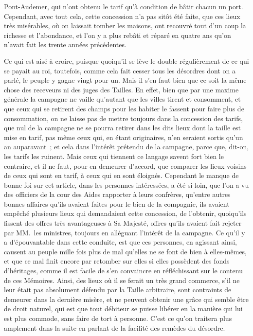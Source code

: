 \documentclass[french,twoside]{book} %
\begin{document}
Pont-Audemer, qui n’ont obtenu le tarif qu’à condition de bâtir chacun un port. Cependant, avec tout cela, cette concession n’a pas sitôt été faite, que ces lieux très misérables, où on laissait tomber les maisons, ont recouvré tout d’un coup la richesse et l’abondance, et l’on y a plus rebâti et réparé en quatre ans qu’on n’avait fait les trente années précédentes.\par
Ce qui est aisé à croire, puisque quoiqu’il se lève le double régulièrement de ce qui se payait au roi, toutefois, comme cela fait cesser tous les désordres dont on a parlé, le peuple y gagne vingt pour un. Mais il s’en faut bien que ce soit la même chose des receveurs ni des juges des Tailles. En effet, bien que par une maxime générale la campagne ne vaille qu’autant que les villes tirent et consomment, et que ceux qui se retirent des champs pour les habiter le fassent pour faire plus de consommation, on ne laisse pas de mettre toujours dans la concession des tarifs, que nul de la campagne ne se pourra retirer dans les dits lieux dont la taille est mise en tarif, pas même ceux qui, en étant originaires, n’en seraient sortis qu’un an auparavant ; et cela dans l’intérêt prétendu de la campagne, parce que, dit-on, les tarifs les ruinent. Mais ceux qui tiennent ce langage savent fort bien le contraire, et il ne faut, pour en demeurer d’accord, que comparer les lieux voisins de ceux qui sont en tarif, à ceux qui en sont éloignés. Cependant le manque de bonne foi sur cet article, dans les personnes intéressées, a été si loin, que l’on a vu des officiers de la cour des Aides rapporter à leurs confrères, qu’entre autres bonnes affaires qu’ils avaient faites pour le bien de la compagnie, ils avaient empêché plusieurs lieux qui demandaient cette concession, de l’obtenir, quoiqu’ils fissent des offres très avantageuses à Sa Majesté, offres qu’ils avaient fait rejeter par MM. les ministres, toujours en alléguant l’intérêt de la campagne. Ce qu’il y a d’épouvantable dans cette conduite, est que ces personnes, en agissant ainsi, causent au peuple mille fois plus de mal qu’elles ne se font de bien à elles-mêmes, et que ce mal finit encore par retomber sur elles si elles possèdent des fonds d’héritages, comme il est facile de s’en convaincre en réfléchissant sur le contenu de ces Mémoires. Ainsi, des lieux où il se ferait un très grand commerce, s’il ne leur était pas absolument défendu par la Taille arbitraire, sont contraints de demeurer dans la dernière misère, et ne peuvent obtenir une grâce qui semble être de droit naturel, qui est que tout débiteur se puisse libérer en la manière qui lui est plus commode, sans faire de tort à personne. C’est ce qu’on traitera plus amplement dans la suite en parlant de la facilité des remèdes du désordre.\par
\end{document}

